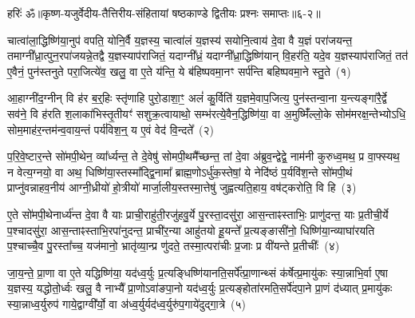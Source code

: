 {}%

{हरिः॑ ॐ}{॥कृष्ण-यजुर्वेदीय-तैत्तिरीय-संहितायां षष्ठकाण्डे द्वितीयः प्रश्नः समाप्तः॥६-२॥}



\setcounter{anuvakam}{0}
चात्वा॑ला॒द्धिष्णि॑या॒नुप॑ वपति॒ योनि॒र्वै य॒ज्ञस्य॒ चात्वा॑लं य॒ज्ञस्य॑ सयोनि॒त्वाय॑ दे॒वा वै य॒ज्ञं परा॑जयन्त॒ तमाग्नी᳚ध्रा॒त्पुन॒रपा॑जयन्ने॒तद्वै य॒ज्ञस्याप॑राजितं॒ यदाग्नी᳚ध्रं॒ यदाग्नी᳚ध्रा॒द्धिष्णि॑यान् वि॒हर॑ति॒ यदे॒व य॒ज्ञस्याप॑राजितं॒ तत॑ ए॒वैनं॒ पुन॑स्तनुते परा॒जित्ये॑व॒ खलु॒ वा ए॒ते य॑न्ति॒ ये ब॑हिष्पवमा॒नꣳ सर्प॑न्ति बहिष्पवमा॒ने स्तु॒ते~(१)\ip

आ॒हाग्नी॑द॒ग्नीन् वि ह॑र ब॒र्॒\mbox{}हिः स्तृ॑णाहि पुरो॒डाशा॒ꣳ॒ अलं॑ कु॒र्विति॑ य॒ज्ञमे॒वाप॒जित्य॒ पुन॑स्तन्वा॒ना य॒न्त्यङ्गा॑रै॒र्द्वे सव॑ने॒ वि ह॑रति श॒लाका॑भिस्तृ॒तीयꣳ॑ सशुक्र॒त्वायाथो॒ सम्भ॑रत्ये॒वैन॒द्धिष्णि॑या॒ वा अ॒मुष्मिँ॑ल्लो॒के सोम॑मरक्ष॒न्तेभ्यो\-ऽधि॒ सोम॒माह॑र॒न्तम॑न्व॒वाय॒न्तं पर्य॑विश॒न्॒ य ए॒वं वेद॑ वि॒न्दते᳚~(२)\ip

प॒रि॒वे॒ष्टार॒न्ते सो॑मपी॒थेन॒ व्या᳚र्ध्यन्त॒ ते दे॒वेषु॑ सोमपी॒थमै᳚च्छन्त॒ तां दे॒वा अ॑ब्रुव॒न्द्वेद्वे॒ नाम॑नी कुरुध्व॒मथ॒ प्र वा॒फ्स्यथ॒ न वेत्य॒ग्नयो॒ वा अथ॒ धिष्णि॑या॒स्तस्मा᳚द्\-द्वि॒नामा᳚ ब्राह्म॒णो\-ऽर्धु॑क॒स्तेषां॒ ये नेदि॑ष्ठं प॒र्यवि॑श॒न्ते सो॑मपी॒थं प्राप्नु॑वन्नाहव॒नीय॑ आग्नी॒ध्रीयो॑ हो॒त्रीयो॑ मार्जा॒लीय॒स्तस्मा॒त्तेषु॑ जुह्वत्यति॒हाय॒ वष॑ट्करोति॒ वि हि~(३)\ip

ए॒ते सो॑मपी॒थेनार्ध्य॑न्त दे॒वा वै याः प्राची॒राहु॑ती॒रजु॑हवु॒र्ये पु॒रस्ता॒दसु॑रा॒ आस॒न्ताꣴस्ताभिः॒ प्राणु॑दन्त॒ याः प्र॒तीची॒र्ये प॒श्चादसु॑रा॒ आस॒न्ताꣴस्ताभि॒रपा॑नुदन्त॒ प्राची॑र॒न्या आहु॑तयो हू॒यन्ते᳚ प्र॒त्यङ्ङासी॑नो॒ धिष्णि॑या॒न्व्याघा॑रयति प॒श्चाच्चै॒व पु॒रस्ता᳚च्च॒ यज॑मानो॒ भ्रातृ॑व्या॒न्प्र णु॑दते॒ तस्मा॒त्परा॑चीः प्र॒जाः प्र वी॑यन्ते प्र॒तीचीः᳚~(४)\ip

जा॒य॒न्ते॒ प्रा॒णा वा ए॒ते यद्धिष्णि॑या॒ यद॑ध्व॒र्युः प्र॒त्यङ्धिष्णि॑यानति॒सर्पे᳚त्प्रा॒णान्थ्सं क॑र्\mbox{}षेत्प्र॒मायु॑कः स्या॒न्नाभि॒र्वा ए॒षा य॒ज्ञस्य॒ यद्धोतो॒र्ध्वः खलु॒ वै नाभ्यै᳚ प्रा॒णो\-ऽवा॑ङपा॒नो यद॑ध्व॒र्युः प्र॒त्यङ्होता॑रमति॒सर्पे॑दपा॒ने प्रा॒णं द॑ध्यात् प्र॒मायु॑कः स्या॒न्नाध्व॒र्युरुप॑ गाये॒द्वाग्वी᳚र्यो॒ वा अ॑ध्व॒र्युर्यद॑ध्व॒र्युरु॑प॒गाये॑दुद्गा॒त्रे~(५)\ip

